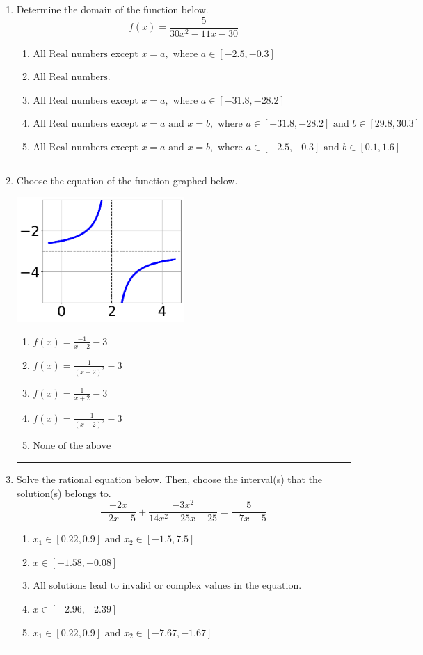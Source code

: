 \documentclass[14pt]{extbook}
\newcommand{\litem}[1]{\item#1\hspace*{-1cm}\rule{\textwidth}{0.4pt}}
\begin{document}
\begin{enumerate}
{\begin{enumerate}[label=\Alph*.]
\end{enumerate} }
\litem{
Determine the domain of the function below.\[ f(x) = \frac{5}{30x^{2} -11 x -30} \]\begin{enumerate}[label=\Alph*.]
\item \( \text{All Real numbers except } x = a, \text{ where } a \in [-2.5, -0.3] \)
\item \( \text{All Real numbers.} \)
\item \( \text{All Real numbers except } x = a, \text{ where } a \in [-31.8, -28.2] \)
\item \( \text{All Real numbers except } x = a \text{ and } x = b, \text{ where } a \in [-31.8, -28.2] \text{ and } b \in [29.8, 30.3] \)
\item \( \text{All Real numbers except } x = a \text{ and } x = b, \text{ where } a \in [-2.5, -0.3] \text{ and } b \in [0.1, 1.6] \)

\end{enumerate} }
\litem{
Choose the equation of the function graphed below.
\begin{center}
    \includegraphics[width=0.5\textwidth]{../Figures/rationalGraphToEquationB.png}
\end{center}
\begin{enumerate}[label=\Alph*.]
\item \( f(x) = \frac{-1}{x - 2} - 3 \)
\item \( f(x) = \frac{1}{(x + 2)^2} - 3 \)
\item \( f(x) = \frac{1}{x + 2} - 3 \)
\item \( f(x) = \frac{-1}{(x - 2)^2} - 3 \)
\item \( \text{None of the above} \)

\end{enumerate} }
\litem{
Solve the rational equation below. Then, choose the interval(s) that the solution(s) belongs to.\[ \frac{-2x}{-2x + 5} + \frac{-3x^{2}}{14x^{2} -25 x -25} = \frac{5}{-7x -5} \]\begin{enumerate}[label=\Alph*.]
\item \( x_1 \in [0.22, 0.9] \text{ and } x_2 \in [-1.5,7.5] \)
\item \( x \in [-1.58,-0.08] \)
\item \( \text{All solutions lead to invalid or complex values in the equation.} \)
\item \( x \in [-2.96,-2.39] \)
\item \( x_1 \in [0.22, 0.9] \text{ and } x_2 \in [-7.67,-1.67] \)


\end{enumerate}}
\end{enumerate}
\end{document}
